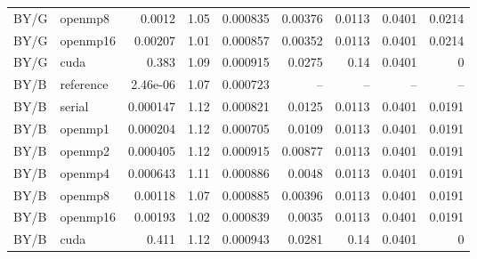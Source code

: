 \documentclass[11pt]{article}
\begin{document}
\begin{longtable}{llrrrrrrr}
BY/G & openmp8 & 0.0012 & 1.05 & 0.000835 & 0.00376 & 0.0113 & 0.0401 & 0.0214\\
BY/G & openmp16 & 0.00207 & 1.01 & 0.000857 & 0.00352 & 0.0113 & 0.0401 & 0.0214\\
BY/G & cuda & 0.383 & 1.09 & 0.000915 & 0.0275 & 0.14 & 0.0401 & 0\\
BY/B & reference & 2.46e-06 & 1.07 & 0.000723 & -- & -- & -- & --\\
BY/B & serial & 0.000147 & 1.12 & 0.000821 & 0.0125 & 0.0113 & 0.0401 & 0.0191\\
BY/B & openmp1 & 0.000204 & 1.12 & 0.000705 & 0.0109 & 0.0113 & 0.0401 & 0.0191\\
BY/B & openmp2 & 0.000405 & 1.12 & 0.000915 & 0.00877 & 0.0113 & 0.0401 & 0.0191\\
BY/B & openmp4 & 0.000643 & 1.11 & 0.000886 & 0.0048 & 0.0113 & 0.0401 & 0.0191\\
BY/B & openmp8 & 0.00118 & 1.07 & 0.000885 & 0.00396 & 0.0113 & 0.0401 & 0.0191\\
BY/B & openmp16 & 0.00193 & 1.02 & 0.000839 & 0.0035 & 0.0113 & 0.0401 & 0.0191\\
BY/B & cuda & 0.411 & 1.12 & 0.000943 & 0.0281 & 0.14 & 0.0401 & 0\\
\bottomrule\end{longtable}\normalsize
\end{document}
